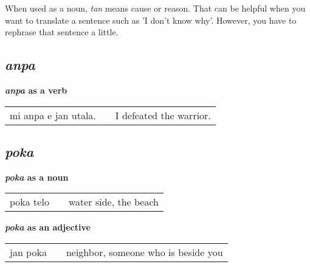 When used as a noun, \textit{tan} means cause or reason. 
That can be helpful when you want to translate a sentence such as 'I don't know why'. 
However, you have to rephrase that sentence a little.
%
%

\subsection*{\textit{anpa}}
%
\textbf{\textit{anpa} as a verb} \\
\begin{supertabular}{p{5,5cm}|ll}
mi anpa e jan utala. && I defeated the warrior. \\
\end{supertabular} 
%
%
\subsection*{\textit{poka}}
\textbf{\textit{poka} as a noun} \\
\begin{supertabular}{p{5,5cm}|ll}
poka telo && water side, the beach \\
\end{supertabular} 

\textbf{\textit{poka} as an adjective} \\
\begin{supertabular}{p{5,5cm}|ll}
jan poka && neighbor, someone who is beside you \\
\end{supertabular} 
%
%
\newpage
{}
